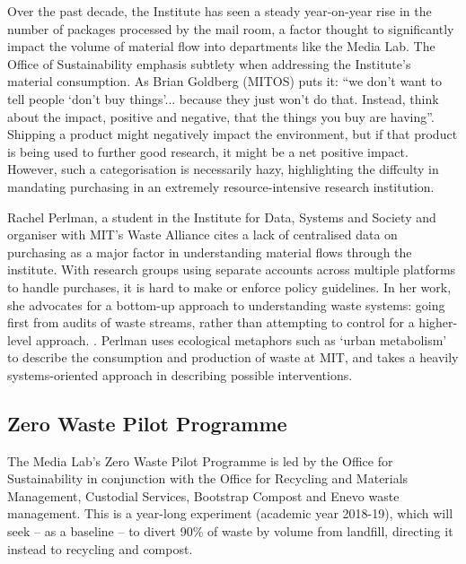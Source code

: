 \documentclass[nofonts,nols,justified,nobib]{tufte-book}
\begin{document}
Over the past decade, the Institute has seen a steady year-on-year rise in the number of packages processed by the mail room, a factor thought to significantly impact the volume of material flow into departments like the Media Lab. The Office of Sustainability emphasis subtlety when addressing the Institute's material consumption. As Brian Goldberg (MITOS) puts it: ``we don't want to tell people `don't buy things'... because they just won't do that. Instead, think about the impact, positive and negative, that the things you buy are having''. Shipping a product might negatively impact the environment, but if that product is being used to further good research, it might be a net positive impact. However, such a categorisation is necessarily hazy, highlighting the diffculty in mandating purchasing in an extremely resource-intensive research institution.


Rachel Perlman, a student in the Institute for Data, Systems and Society and organiser with MIT's Waste Alliance cites a lack of centralised data on purchasing as a major factor in understanding material flows through the institute. With research groups using separate accounts across multiple platforms to handle purchases, it is hard to make or enforce policy guidelines. In her work, she advocates for a bottom-up approach to understanding waste systems: going first from audits of waste streams, rather than attempting to control for a higher-level approach. \cite{perlman_material_2016}. Perlman uses ecological metaphors such as `urban metabolism' to describe the consumption and production of waste at MIT, and takes a heavily systems-oriented approach in describing possible interventions.


\subsection*{Zero Waste Pilot Programme}

The Media Lab's Zero Waste Pilot Programme is led by the Office for Sustainability in conjunction with the Office for Recycling and Materials Management, Custodial Services, Bootstrap Compost and Enevo waste management. This is a year-long experiment (academic year 2018-19), which will seek -- as a baseline -- to divert 90\% of waste by volume from landfill, directing it instead to recycling and compost. 
\end{document}
